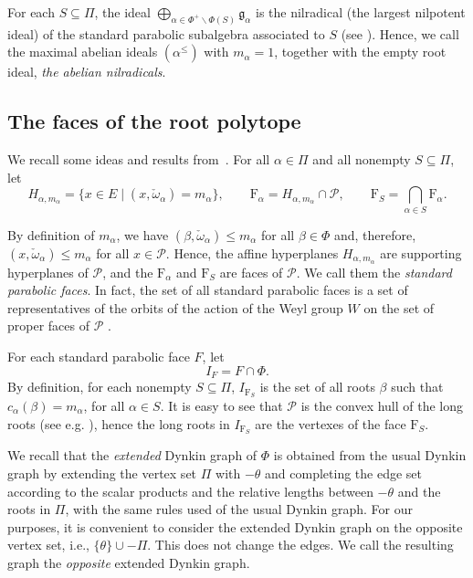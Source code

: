 \documentclass[ALCO,published]{cedram}
\newcommand\pol{\mathcal P}
\theoremstyle{plain}
\newcommand\mf{\mathfrak}
\newcommand\smeno{\smallsetminus}
\newcommand\pol{\mathcal P}
\newcommand\al{\alpha}
\newcommand\be{\beta}
\renewcommand{\leq}{\leqslant}
\begin{document}
\par
For each $S\subseteq \Pi$, the ideal $\bigoplus\limits_{\al\in \Phi^+\smeno \Phi(S)}\mf g_\al$ is the nilradical (the largest nilpotent ideal) of the standard parabolic subalgebra  associated to $S$ (see \cite[Ch.~VIII, \S~3.4]{Bou2}). 
Hence, we call the maximal abelian ideals $(\al^\leq)$ with $m_\al=1$, together  with the empty root ideal, {\it the abelian nilradicals}. 

\subsection{The faces of the root polytope}\label{ssec:faces}
We recall some ideas and results from~\cite{CM1}. 
For all $\al\in \Pi$ and  all nonempty $S\subseteq \Pi$,  let
$$
H_{\al, m_\al}=\{x\in E\mid(x, \check\omega_\al)=m_\al\}, \qquad 
\mathrm F_\al=H_{\al, m_\al}\cap \pol,
\qquad
\mathrm F_S=\bigcap_{\al\in S} \mathrm F_\al.
$$

By definition of $m_\al$, we have $(\be, \check\omega_\al)\leq m_\al$ for all $\be\in \Phi$ and, therefore, $(x, \check\omega_\al)\leq m_\al$ for all $x\in \pol$. 
Hence, the affine hyperplanes $H_{\al, m_\al}$ are supporting hyperplanes of $\pol$, and the $\mathrm F_\al$ and  $\mathrm F_S$ are faces of $\pol$.  
We call them the {\it standard parabolic faces}. 
In fact, the set of all standard parabolic faces is a set of representatives of the orbits of  the action of the Weyl group $W$  on the set of proper faces of $\pol$ \cite{CM1} . 

\par
For each standard parabolic face $F$, let 
$$
I_F=F \cap \Phi.
$$
By definition,  for each nonempty $S\subseteq \Pi$, $I_{\mathrm F_S}$ is the set of all roots $\be$ such that $c_\al(\be)=m_\al$, for all $\al\in S$. 
It is easy to see that $\pol$ is the convex hull of the long roots (see  e.g. \cite{CM3}), hence the long roots in $I_{\mathrm F_S}$ are the vertexes of the face $\mathrm F_S$. 
\par

We recall that the {\it extended} Dynkin graph of $\Phi$ is obtained from the usual Dynkin graph by extending the vertex set $\Pi$ with $-\theta$ and completing the edge set according to the scalar products and the relative lengths between $-\theta$ and the roots in $\Pi$, with the same rules  used of the usual Dynkin graph.
For our purposes, it is convenient to consider the extended Dynkin graph on the opposite vertex set, i.e., $\{\theta\}\cup -\Pi$. 
This does not change the edges. 
We call the resulting graph the {\it opposite} extended Dynkin graph.
\par
\end{document}
